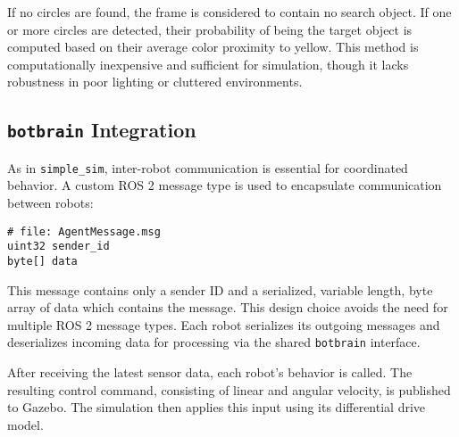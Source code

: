 If no circles are found, the frame is considered to contain no search object. If one or more circles are detected, their probability of being the target object is computed based on their average color proximity to yellow. This method is computationally inexpensive and sufficient for simulation, though it lacks robustness in poor lighting or cluttered environments.

\subsection{\texttt{botbrain} Integration}
\label{sub:Botbrain_integration}
As in \texttt{simple\_sim}, inter-robot communication is essential for coordinated behavior. A custom ROS 2 message type is used to encapsulate communication between robots:

\begin{verbatim}
# file: AgentMessage.msg
uint32 sender_id
byte[] data
\end{verbatim}

This message contains only a sender ID and a serialized, variable length, byte array of data which contains the message. This design choice avoids the need for multiple ROS 2 message types. Each robot serializes its outgoing messages and deserializes incoming data for processing via the shared \texttt{botbrain} interface.

After receiving the latest sensor data, each robot's behavior is called. The resulting control command, consisting of linear and angular velocity, is published to Gazebo. The simulation then applies this input using its differential drive model.
